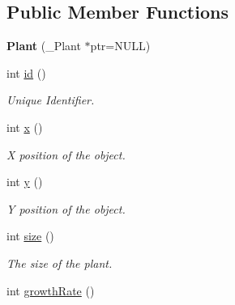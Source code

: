\subsection*{\-Public \-Member \-Functions}
\begin{DoxyCompactItemize}
\item 
\hypertarget{classPlant_a900c6a37bcd45efc4ef085442d7a680d}{{\bfseries \-Plant} (\-\_\-\-Plant $\ast$ptr=\-N\-U\-L\-L)}\label{classPlant_a900c6a37bcd45efc4ef085442d7a680d}

\item 
\hypertarget{classPlant_ace6f48618c4429cfe710b2fce32ef434}{int \hyperlink{classPlant_ace6f48618c4429cfe710b2fce32ef434}{id} ()}\label{classPlant_ace6f48618c4429cfe710b2fce32ef434}

\begin{DoxyCompactList}\small\item\em \-Unique \-Identifier. \end{DoxyCompactList}\item 
\hypertarget{classPlant_a9bc3d88cdc48e1c7da92fd6f87d656b2}{int \hyperlink{classPlant_a9bc3d88cdc48e1c7da92fd6f87d656b2}{x} ()}\label{classPlant_a9bc3d88cdc48e1c7da92fd6f87d656b2}

\begin{DoxyCompactList}\small\item\em \-X position of the object. \end{DoxyCompactList}\item 
\hypertarget{classPlant_a214c873dff8a6a8aa32b2f74f76544fb}{int \hyperlink{classPlant_a214c873dff8a6a8aa32b2f74f76544fb}{y} ()}\label{classPlant_a214c873dff8a6a8aa32b2f74f76544fb}

\begin{DoxyCompactList}\small\item\em \-Y position of the object. \end{DoxyCompactList}\item 
\hypertarget{classPlant_aace250ce9f54d1410eccbf4d24944fef}{int \hyperlink{classPlant_aace250ce9f54d1410eccbf4d24944fef}{size} ()}\label{classPlant_aace250ce9f54d1410eccbf4d24944fef}

\begin{DoxyCompactList}\small\item\em \-The size of the plant. \end{DoxyCompactList}\item 
\hypertarget{classPlant_ab0c6325c88752599ba74e028cf6e26b9}{int \hyperlink{classPlant_ab0c6325c88752599ba74e028cf6e26b9}{growth\-Rate} ()}\label{classPlant_ab0c6325c88752599ba74e028cf6e26b9}


\end{DoxyCompactItemize}
